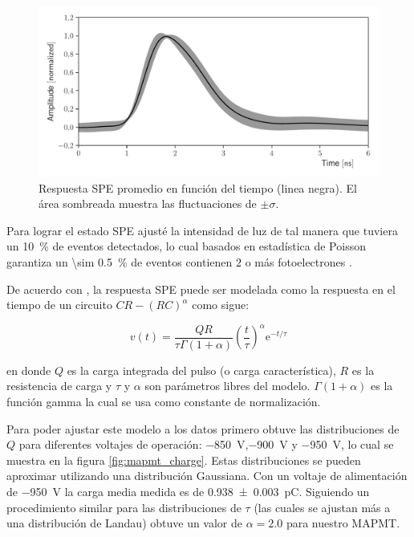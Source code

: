 \begin{figure}
        \centering
        \includegraphics[width=\textwidth]{sphe-signal.pdf}
        \caption{Respuesta SPE promedio en función del tiempo (linea negra). El área sombreada muestra las fluctuaciones de $\pm\sigma$.}
        \label{fig:sphe}
\end{figure}

Para lograr el estado SPE ajusté la intensidad de luz de tal manera que tuviera un \SI{10}{\percent} de eventos detectados, lo cual basados en estadística de Poisson garantiza un \SI{\sim 0.5}{\percent} de eventos contienen $2$ o más fotoelectrones \cite{barnhill08}.

De acuerdo con \cite{sanchez10}, la respuesta SPE puede ser modelada como la respuesta en el tiempo de un circuito $CR-(RC)^{\alpha}$ como sigue:

\begin{equation}
\label{equ:sphe}
v(t)=\frac{QR}{\tau\Gamma(1+\alpha)}\left(\frac{t}{\tau}\right)^{\alpha}\mathrm{e}^{-t/\tau}
\end{equation}

en donde $Q$ es la carga integrada del pulso (o carga característica), $R$ es la resistencia de carga y
$\tau$ y $\alpha$ son parámetros libres del modelo. $\Gamma(1+\alpha)$ es la función gamma la cual se usa como constante de normalización.

Para poder ajustar este modelo a los datos primero obtuve las distribuciones de $Q$ para diferentes voltajes de operación: \SI{-850}{\volt},\SI{-900}{\volt} y \SI{-950}{\volt}, lo cual se muestra en la figura \ref{fig:mapmt_charge}. Estas distribuciones se pueden aproximar utilizando una distribución Gaussiana. Con un voltaje de alimentación de \SI{-950}{\volt} la carga media medida es de \SI{0.938(3)}{\pico\coulomb}. Siguiendo un procedimiento similar para las distribuciones de $\tau$ (las cuales se ajustan más a una distribución de Landau) obtuve un valor de $\alpha=2.0$ para nuestro MAPMT.

